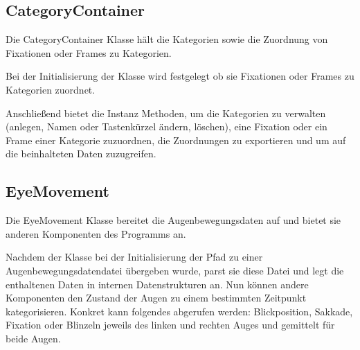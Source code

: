 \documentclass[a4paper,draft]{scrartcl}
\begin{document}
\subsection{CategoryContainer}
Die CategoryContainer Klasse hält die Kategorien sowie die Zuordnung von Fixationen oder Frames zu Kategorien.

Bei der Initialisierung der Klasse wird festgelegt ob sie Fixationen oder Frames zu Kategorien zuordnet.

Anschließend bietet die Instanz Methoden, um die Kategorien zu verwalten (anlegen, Namen oder Tastenkürzel ändern, löschen), eine Fixation oder ein Frame einer Kategorie zuzuordnen, die Zuordnungen zu exportieren und um auf die beinhalteten Daten zuzugreifen.

\subsection{EyeMovement}
Die EyeMovement Klasse bereitet die Augenbewegungsdaten auf und bietet sie anderen Komponenten des Programms an.

Nachdem der Klasse bei der Initialisierung der Pfad zu einer Augenbewegungsdatendatei übergeben wurde, parst sie diese Datei und legt die enthaltenen Daten in internen Datenstrukturen an. Nun können andere Komponenten den Zustand der Augen zu einem bestimmten Zeitpunkt kategorisieren. Konkret kann folgendes abgerufen werden: Blickposition, Sakkade, Fixation oder Blinzeln jeweils des linken und rechten Auges und gemittelt für beide Augen.
\end{document}
